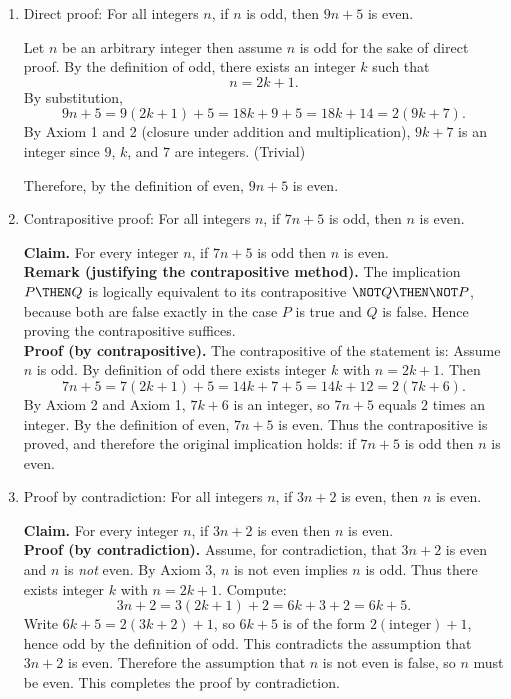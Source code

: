   \begin{enumerate}
  \item Direct proof: For all integers $n$, if $n$ is odd, then $9n + 5$ is even.
  \begin{subprove}
    Let $n$ be an arbitrary integer then assume $n$ is odd for the sake of direct proof. 
    By the definition of odd, there exists an integer $k$ such that
    \[
      n = 2k + 1.
    \]
    By substitution, 
    \[
      9n + 5 = 9(2k + 1) + 5 = 18k + 9 + 5 = 18k + 14= 2(9k + 7).
    \]
    By Axiom 1 and 2 (closure under addition and multiplication), $9k+7$ is an integer since $9$, $k$, and $7$ are integers. (Trivial)

    Therefore, by the definition of even, $9n+5$ is even.
  \end{subprove}

  \item Contrapositive proof: For all integers $n$, if $7n + 5$ is odd, then $n$ is even.\\
  \begin{subanswer}
    \textbf{Claim.} For every integer $n$, if $7n+5$ is odd then $n$ is even.\\

    \textbf{Remark (justifying the contrapositive method).} The implication $P \THEN Q$ is logically equivalent to its contrapositive $\NOT Q \THEN \NOT P$, because both are false exactly in the case $P$ is true and $Q$ is false. Hence proving the contrapositive suffices.\\

    \textbf{Proof (by contrapositive).} The contrapositive of the statement is:  Assume $n$ is odd. By definition of odd there exists integer $k$ with $n = 2k + 1$. Then
    \[
      7n + 5 = 7(2k+1) + 5 = 14k + 7 + 5 = 14k + 12 = 2(7k + 6).
    \]
    By Axiom 2 and Axiom 1, $7k+6$ is an integer, so $7n+5$ equals $2$ times an integer. By the definition of even, $7n+5$ is even. Thus the contrapositive is proved, and therefore the original implication holds: if $7n+5$ is odd then $n$ is even.
  \end{subanswer}

  \item Proof by contradiction: For all integers $n$, if $3n + 2$ is even, then $n$ is even.\\
  \begin{subanswer}
    \textbf{Claim.} For every integer $n$, if $3n+2$ is even then $n$ is even.\\

    \textbf{Proof (by contradiction).} Assume, for contradiction, that $3n+2$ is even and $n$ is \emph{not} even. By Axiom 3, $n$ is not even implies $n$ is odd. Thus there exists integer $k$ with $n = 2k + 1$. Compute:
    \[
      3n + 2 = 3(2k+1) + 2 = 6k + 3 + 2 = 6k + 5.
    \]
    Write $6k+5 = 2(3k+2) + 1$, so $6k+5$ is of the form $2(\text{integer})+1$, hence odd by the definition of odd. This contradicts the assumption that $3n+2$ is even. Therefore the assumption that $n$ is not even is false, so $n$ must be even. This completes the proof by contradiction.
  \end{subanswer}
  \end{enumerate}

